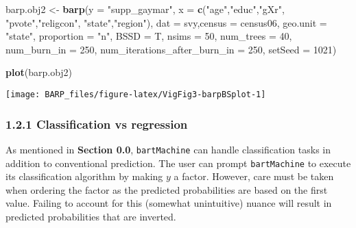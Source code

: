 \documentclass[]{article}
\newenvironment{Shaded}{\begin{snugshade}}{\end{snugshade}}
\newcommand{\KeywordTok}[1]{\textcolor[rgb]{0.13,0.29,0.53}{\textbf{#1}}}
\newcommand{\DataTypeTok}[1]{\textcolor[rgb]{0.13,0.29,0.53}{#1}}
\newcommand{\DecValTok}[1]{\textcolor[rgb]{0.00,0.00,0.81}{#1}}
\newcommand{\StringTok}[1]{\textcolor[rgb]{0.31,0.60,0.02}{#1}}
\newcommand{\NormalTok}[1]{#1}
\begin{document}
\begin{Shaded}
\begin{Highlighting}[]
\NormalTok{barp.obj2 <-}\StringTok{ }\KeywordTok{barp}\NormalTok{(}\DataTypeTok{y =} \StringTok{"supp_gaymar"}\NormalTok{,}
                  \DataTypeTok{x =} \KeywordTok{c}\NormalTok{(}\StringTok{"age"}\NormalTok{,}\StringTok{"educ"}\NormalTok{,}\StringTok{"gXr"}\NormalTok{,}
                       \StringTok{"pvote"}\NormalTok{,}\StringTok{"religcon"}\NormalTok{,}
                       \StringTok{"state"}\NormalTok{,}\StringTok{"region"}\NormalTok{),}
                  \DataTypeTok{dat =}\NormalTok{ svy,}\DataTypeTok{census =}\NormalTok{ census06,}
                  \DataTypeTok{geo.unit =} \StringTok{"state"}\NormalTok{,}
                  \DataTypeTok{proportion =} \StringTok{"n"}\NormalTok{,}
                  \DataTypeTok{BSSD =}\NormalTok{ T,}
                  \DataTypeTok{nsims =} \DecValTok{50}\NormalTok{,}
                  \DataTypeTok{num_trees =} \DecValTok{40}\NormalTok{,}
                  \DataTypeTok{num_burn_in =} \DecValTok{250}\NormalTok{,}
                  \DataTypeTok{num_iterations_after_burn_in =} \DecValTok{250}\NormalTok{,}
                  \DataTypeTok{setSeed =} \DecValTok{1021}\NormalTok{)}
\end{Highlighting}
\end{Shaded}

\begin{Shaded}
\begin{Highlighting}[]
\KeywordTok{plot}\NormalTok{(barp.obj2)}
\end{Highlighting}
\end{Shaded}

\begin{center}\texttt{[image: BARP\_files/figure-latex/VigFig3-barpBSplot-1]} \end{center}

\subsubsection{1.2.1 Classification vs
regression}\label{classification-vs-regression}

As mentioned in \textbf{Section 0.0}, \texttt{bartMachine} can handle
classification tasks in addition to conventional prediction. The user
can prompt \texttt{bartMachine} to execute its classification algorithm
by making \(y\) a factor. However, care must be taken when ordering the
factor as the predicted probabilities are based on the first value.
Failing to account for this (somewhat unintuitive) nuance will result in
predicted probabilities that are inverted.
\end{document}
